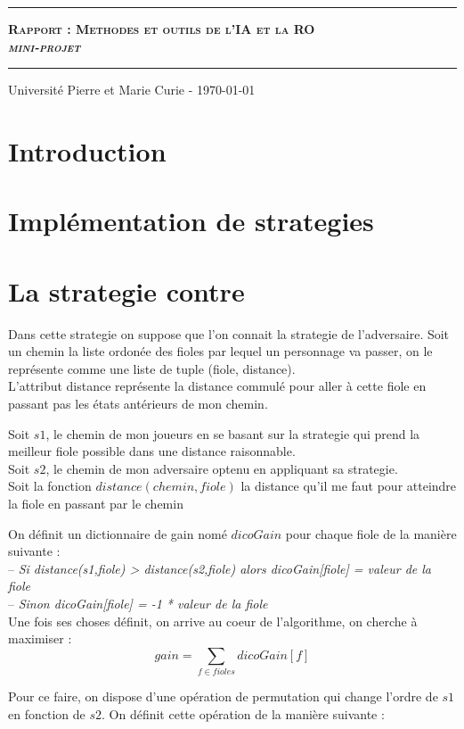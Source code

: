 \documentclass[11pt]{article}
\date{}
\author{\scshape Becirspahic Lucas}
\makeatletter
\renewcommand{\maketitle}{
\begin{titlepage}%
    \vspace*{7cm}
	\hrule
	\begin{center}
		{\bfseries \scshape {\huge Rapport : Methodes et outils de l'IA et la RO} \\[1em] {\itshape \LARGE mini-projet}}
	\end{center}
	\vspace{1em}
	\hrule
	 \begin{center}
      \Large \@author \par
    \end{center}	
    \vfill
	\begin{center}
	Université Pierre et Marie Curie - \today
	\end{center}
    \end{titlepage}
}
\makeatother
\begin{document}
\maketitle


\section*{Introduction}


\section{Implémentation de strategies}

\section{La strategie contre}

Dans cette strategie on suppose que l'on connait la strategie de l'adversaire.
Soit un chemin la liste ordonée des fioles par lequel un personnage va passer, on le représente comme une liste de tuple (fiole, distance). \\
L'attribut distance représente la distance commulé pour aller à cette fiole en passant pas les états antérieurs de mon chemin.

Soit $s1$, le chemin de mon joueurs en se basant sur la strategie qui prend la meilleur fiole possible dans une distance raisonnable. \\
Soit $s2$, le chemin de mon adversaire optenu en appliquant sa strategie. \\
Soit la fonction $distance(chemin,fiole)$ la distance qu'il me faut pour atteindre la fiole en passant par le chemin

On définit un dictionnaire de gain nomé $dicoGain$ pour chaque fiole de la manière suivante : \\
-- {\itshape Si distance(s1,fiole) > distance(s2,fiole) alors dicoGain[fiole] = valeur de la fiole} \\
-- {\itshape Sinon dicoGain[fiole] = -1 * valeur de la fiole } \\

Une fois ses choses définit, on arrive au coeur de l'algorithme, on cherche à maximiser : \\
\[ gain = \sum_{f \in fioles} dicoGain[f] \]

Pour ce faire, on dispose d'une opération de permutation qui change l'ordre de $s1$ en fonction de $s2$.
On définit cette opération de la manière suivante : 
\end{document}
